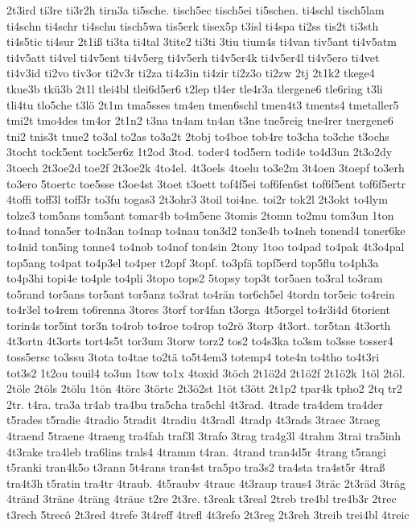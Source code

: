 {2t3ird
ti3re
ti3r2h
tirn3a
ti5sche.
tisch5ec
tisch5ei
ti5schen.
ti4schl
tisch5lam
ti4schn
ti4schr
ti4schu
tisch5wa
tis5erk
tisex5p
t3isl
ti4spa
ti2ss
tis2t
ti3sth
ti4s5tic
ti4sur
2t1iß
ti3ta
ti4tal
3tite2
ti3ti
3tiu
tium4s
ti4van
tiv5ant
ti4v5atm
ti4v5att
ti4vel
ti4v5ent
ti4v5erg
ti4v5erh
ti4v5er4k
ti4v5er4l
ti4v5ero
ti4vet
ti4v3id
ti2vo
tiv3or
ti2v3r
ti2za
ti4z3in
ti4zir
ti2z3o
ti2zw
2tj
2t1k2
tkege4
tkue3b
tkü3b
2t1l
tlei4bl
tlei6d5er6
t2lep
tl4er
tle4r3a
tlergene6
tle6ring
t3li
tli4tu
tlo5che
t3lö
2t1m
tma5sses
tm4en
tmen6schl
tmen4t3
tments4
tmetaller5
tmi2t
tmo4des
tm4or
2t1n2
t3na
tn4am
tn4an
t3ne
tne5reig
tne4rer
tnergene6
tni2
tnis3t
tnue2
to3al
to2as
to3a2t
2tobj
to4boe
tob4re
to3cha
to3che
t3ochs
3tocht
tock5ent
tock5er6z
1t2od
3tod.
toder4
tod5ern
todi4e
to4d3un
2t3o2dy
3toech
2t3oe2d
toe2f
2t3oe2k
4to4el.
4t3oels
4toelu
to3e2m
3t4oen
3toepf
to3erh
to3ero
5toertc
toe5sse
t3oe4st
3toet
t3oett
tof4f5ei
tof6fen6st
tof6f5ent
tof6f5ertr
4toffi
toff3l
toff3r
to3fu
togas3
2t3ohr3
3toil
toi4ne.
toi2r
tok2l
2t3okt
to4lym
tolze3
tom5ans
tom5ant
tomar4b
to4m5ene
3tomis
2tomn
to2mu
tom3un
1ton
to4nad
tona5er
to4n3an
to4nap
to4nau
ton3d2
ton3e4b
to4neh
tonend4
toner6ke
to4nid
ton5ing
tonne4
to4nob
to4nof
ton4sin
2tony
1too
to4pad
to4pak
4t3o4pal
top5ang
to4pat
to4p3el
to4per
t2opf
3topf.
to3pfä
topf5erd
top5flu
to4ph3a
to4p3hi
topi4e
to4ple
to4pli
3topo
tops2
5topsy
top3t
tor5aen
to3ral
to3ram
to5rand
tor5ans
tor5ant
tor5anz
to3rat
to4rän
tor6ch5el
4tordn
tor5eic
to4rein
to4r3el
to4rem
to6renna
3tores
3torf
tor4fan
t3orga
4t5orgel
to4r3i4d
6torient
torin4s
tor5int
tor3n
to4rob
to4roe
to4rop
to2rö
3torp
4t3ort.
tor5tan
4t3orth
4t3ortn
4t3orts
tort4s5t
tor3um
3torw
torz2
tos2
to4s3ka
to3sm
to3sse
tosser4
toss5ersc
to3ssu
3tota
to4tae
to2tä
to5t4em3
totemp4
tote4n
to4tho
to4t3ri
tot3s2
1t2ou
touil4
to3un
1tow
to1x
4toxid
3töch
2t1ö2d
2t1ö2f
2t1ö2k
1töl
2töl.
2töle
2töls
2tölu
1tön
4törc
3törtc
2t3ö2st
1töt
t3ött
2t1p2
tpar4k
tpho2
2tq
tr2
2tr.
t4ra.
tra3a
tr4ab
tra4bu
tra5cha
tra5chl
4t3rad.
4trade
tra4dem
tra4der
t5rades
t5radie
4tradio
5tradit
4tradiu
4t3radl
4tradp
4t3rads
3traec
3traeg
4traend
5traene
4traeng
tra4fah
traf3l
3trafo
3trag
tra4g3l
4trahm
3trai
tra5inh
4t3rake
tra4leb
tra6lins
trals4
4tramm
t4ran.
4trand
tran4d5r
4trang
t5rangi
t5ranki
tran4k5o
t3rann
5t4rans
tran4st
tra5po
tra3s2
tra4sta
tra4st5r
4traß
tra4t3h
t5ratin
tra4tr
4traub.
4t5raubv
4trauc
4t3raup
traus4
3träc
2t3räd
3träg
4tränd
3träne
4träng
4träuc
t2re
2t3re.
t3reak
t3real
2treb
tre4bl
tre4b3r
2trec
t3rech
5trecô
2t3red
4trefe
3t4reff
4trefl
4t3refo
2t3reg
2t3reh
3treib
trei4bl
4treic
}
